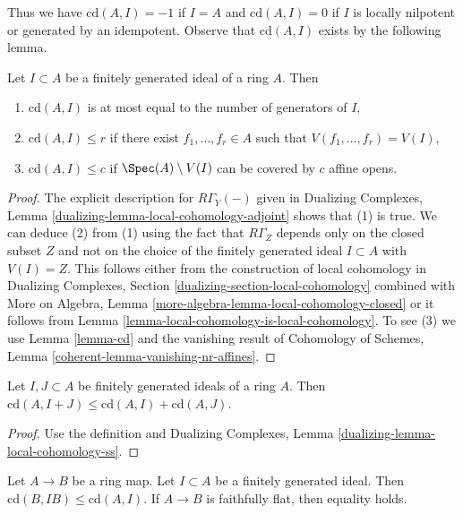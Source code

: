 \noindent
Thus we have $\text{cd}(A, I) = -1$ if
$I = A$ and $\text{cd}(A, I) = 0$ if $I$ is locally nilpotent
or generated by an idempotent.
Observe that $\text{cd}(A, I)$ exists by the following lemma.

\begin{lemma}
\label{lemma-bound-cd}
Let $I \subset A$ be a finitely generated ideal of a ring $A$.
Then
\begin{enumerate}
\item $\text{cd}(A, I)$ is at most equal to the number of
generators of $I$,
\item $\text{cd}(A, I) \leq r$ if there exist $f_1, \ldots, f_r \in A$
such that $V(f_1, \ldots, f_r) = V(I)$,
\item $\text{cd}(A, I) \leq c$ if $\Spec(A) \setminus V(I)$
can be covered by $c$ affine opens.
\end{enumerate}
\end{lemma}

\begin{proof}
The explicit description for $R\Gamma_Y(-)$ given in
Dualizing Complexes, Lemma \ref{dualizing-lemma-local-cohomology-adjoint}
shows that (1) is true. We can deduce (2) from (1) using the
fact that $R\Gamma_Z$ depends only on the closed subset
$Z$ and not on the choice of the finitely generated ideal
$I \subset A$ with $V(I) = Z$. This follows either from the
construction of local cohomology in
Dualizing Complexes, Section \ref{dualizing-section-local-cohomology}
combined with
More on Algebra, Lemma \ref{more-algebra-lemma-local-cohomology-closed}
or it follows from Lemma \ref{lemma-local-cohomology-is-local-cohomology}.
To see (3) we use Lemma \ref{lemma-cd}
and the vanishing result of Cohomology of Schemes, Lemma
\ref{coherent-lemma-vanishing-nr-affines}.
\end{proof}

\begin{lemma}
\label{lemma-cd-sum}
Let $I, J \subset A$ be finitely generated ideals of a ring $A$.
Then $\text{cd}(A, I + J) \leq \text{cd}(A, I) + \text{cd}(A, J)$.
\end{lemma}

\begin{proof}
Use the definition and Dualizing Complexes, Lemma
\ref{dualizing-lemma-local-cohomology-ss}.
\end{proof}

\begin{lemma}
\label{lemma-cd-change-rings}
Let $A \to B$ be a ring map. Let $I \subset A$ be a finitely generated ideal.
Then $\text{cd}(B, IB) \leq \text{cd}(A, I)$. If $A \to B$ is faithfully
flat, then equality holds.
\end{lemma}

